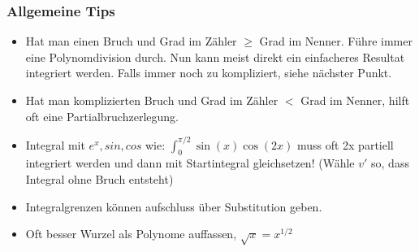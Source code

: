 \subsubsection{Allgemeine Tips}
\begin{itemize}[leftmargin=*]
	\item Hat man einen Bruch und Grad im Zähler $\geq$ Grad im Nenner. Führe immer eine Polynomdivision durch. Nun kann meist direkt ein einfacheres Resultat integriert werden. Falls immer noch zu kompliziert, siehe nächster Punkt.

	\item Hat man komplizierten Bruch und Grad im Zähler $<$ Grad im Nenner, hilft oft eine Partialbruchzerlegung.

	\item Integral mit $e^x,sin,cos$ wie: $\int_0^{\pi/2} \sin(x) \cos(2x)$ muss oft 2x partiell integriert werden und dann mit Startintegral gleichsetzen! (Wähle $v'$ so, dass Integral ohne Bruch entsteht)

	\item Integralgrenzen können aufschluss über Substitution geben.

	\item Oft besser Wurzel als Polynome auffassen, $\sqrt{x} = x^{1/2}$
\end{itemize}



